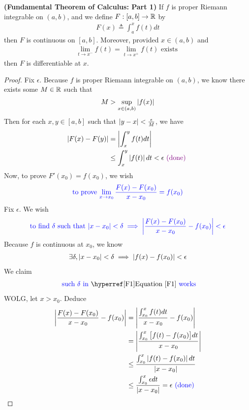 \documentclass{report}
\begin{document}
\begin{theorem}
  \label{FTC1}
  \textbf{(Fundamental Theorem of Calculus: Part 1)} If $f$ is proper Riemann integrable on $(a,b)$, and we define $F:[a,b]\rightarrow \mathbb{R}$ by 
\begin{align*}
F(x)\triangleq \int_a^x f(t)dt
\end{align*}
then $F$ is continuous on  $[a,b]$. Moreover, provided $x \in (a,b)$ and 
\begin{align*}
\lim_{t\to x^-} f(t)=\lim_{t\to x^+} f(t)\text{ exists }
\end{align*}
then $F$ is differentiable at $x$.
\end{theorem}
\begin{proof}
Fix $\epsilon $. Because $f$ is proper Riemann integrable on $(a,b)$, we know there exists some $M\in\mathbb{R}$ such that 
 \begin{align*}
M> \sup_{x\in (a,b)}\left|f(x)\right| 
\end{align*}
Then for each $x,y \in [a,b]$ such that $\left|y-x\right|< \frac{\epsilon }{M}$, we have
\begin{align*}
  \left|F(x)-F(y)\right|&=\left|\int_x^y f(t)dt\right|\\
  &\leq \int_x^y \left|f(t)\right|dt<\epsilon \textcolor{violet}{\text{ (done) }}
\end{align*}
Now, to prove $F'(x_0)=f(x_0)$, we wish 
\begin{align*}
  \textcolor{blue}{\text{ to prove $\lim_{x\to x_0} \frac{F(x)-F(x_0)}{x-x_0}= f(x_0)$ }}
\end{align*}
Fix $\epsilon $. We wish 
\begin{align*}
\textcolor{blue}{\text{ to find $\delta$ such that $\left|x-x_0\right|<\delta \implies \left|\frac{F(x)-F(x_0)}{x-x_0}-f(x_0)\right|<\epsilon $ }}
\end{align*}
Because $f$ is continuous at $x_0$, we know  
\begin{align}
\label{F1}
\exists \delta, \left|x-x_0\right|<\delta \implies \left|f(x)-f(x_0)\right|<\epsilon 
\end{align}
We claim 
\begin{align*}
\blue{\text{ such $\delta$ in}}\text{ \myref{Equation}{F1} }\blue{\text{works}}
\end{align*}
WOLG, let $x>x_0$. Deduce 
\begin{align*}
\left|\frac{F(x)-F(x_0)}{x-x_0}-f(x_0)\right|&=\left|\frac{\int_{x_0}^x f(t)dt}{x-x_0}-f(x_0)\right|\\                  &=\left|\frac{\int_{x_0}^x \big[f(t)-f(x_0) \big]dt}{x-x_0}\right|\\
&\leq \frac{\int_{x_0}^x \left|f(t)-f(x_0)\right|dt}{\left|x-x_0\right|}\\
&\leq \frac{\int_{x_0}^x \epsilon dt}{\left|x-x_0\right|}=\epsilon \textcolor{blue}{\text{ (done) }}
\end{align*}
\end{proof}
\end{document}
